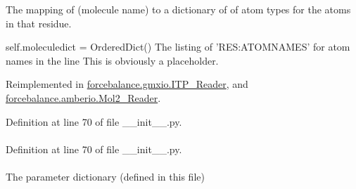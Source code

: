 \-The mapping of (molecule name) to a dictionary of of atom types for the atoms in that residue. 

self.\-moleculedict = \-Ordered\-Dict() \-The listing of '\-R\-E\-S\-:\-A\-T\-O\-M\-N\-A\-M\-E\-S' for atom names in the line \-This is obviously a placeholder. 

\-Reimplemented in \hyperlink{classforcebalance_1_1gmxio_1_1ITP__Reader_a5ed800499e9442adaea0cee243960f94}{forcebalance.\-gmxio.\-I\-T\-P\-\_\-\-Reader}, and \hyperlink{classforcebalance_1_1amberio_1_1Mol2__Reader_acdeaabdae39b208fb9430ee4cd6de113}{forcebalance.\-amberio.\-Mol2\-\_\-\-Reader}.



\-Definition at line 70 of file \-\_\-\-\_\-init\-\_\-\-\_\-.\-py.

\hypertarget{classforcebalance_1_1BaseReader_a4369b5fb663a83b11602daa71db6862e}{
\paragraph[{\-Molecules}]{}}\label{classforcebalance_1_1BaseReader_a4369b5fb663a83b11602daa71db6862e}


\-Definition at line 70 of file \-\_\-\-\_\-init\-\_\-\-\_\-.\-py.

\hypertarget{classforcebalance_1_1custom__io_1_1Gen__Reader_ab805a14dad929387fee0576cda85a46e}{
\paragraph[{pdict}]{}}\label{classforcebalance_1_1custom__io_1_1Gen__Reader_ab805a14dad929387fee0576cda85a46e}


\-The parameter dictionary (defined in this file) 



